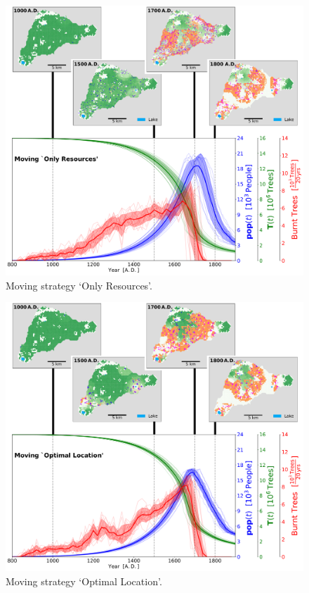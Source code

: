 \begin{figure}
	\centering
	\includegraphics[width=1\textwidth]{images/Results/Moving/alphaResource_EnsembleStatistics+Panels}
	\caption{Moving strategy `Only Resources'.}
	\label{fig:resource}
\end{figure}
\begin{figure}
	\centering
	\includegraphics[width=1\textwidth]{images/Results/Moving/alphaDeterministic_EnsembleStatistics+Panels}
	\caption{Moving strategy `Optimal Location'.}
	\label{fig:optimal}
\end{figure}
